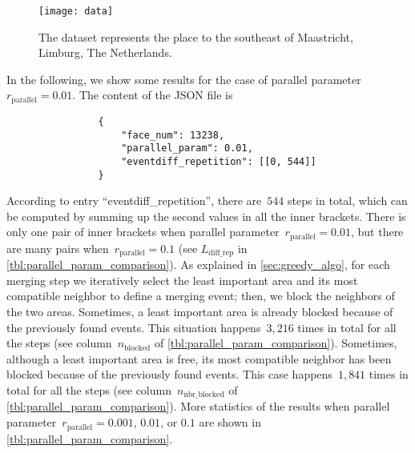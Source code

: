 \documentclass[ijgi,article,submit,moreauthors,pdftex]{Definitions/mdpi}
\begin{document}
\begin{figure}[tb]
\centering
\texttt{[image: data]}
\caption{The dataset represents the place 
    to the southeast of Maastricht, Limburg, The Netherlands.}
\label{fig:data}
\end{figure}





In the following, we show some results for the case of 
parallel parameter~$r_\mathrm{parallel}= 0.01$.
The content of the JSON file is 
\begin{verbatim}
                {
                    "face_num": 13238,
                    "parallel_param": 0.01,                    
                    "eventdiff_repetition": [[0, 544]]
                }
\end{verbatim}
According to entry ``eventdiff\_repetition'',
there are~$544$ steps in total, 
which can be computed by summing up the second values in all the inner brackets.
There is only one pair of inner brackets 
when parallel parameter~$r_\mathrm{parallel}= 0.01$,
but there are many pairs when~$r_\mathrm{parallel}= 0.1$ 
(see $L_\mathrm{diff\_rep}$ in \tbl\ref{tbl:parallel_param_comparison}).
%
As explained in \sect\ref{sec:greedy_algo}, 
for each merging step we iteratively select the least important area 
and its most compatible neighbor to define a merging event; 
then, we block the neighbors of the two areas.
Sometimes, a least important area is already blocked 
because of the previously found events.
This situation happens~$3{,}216$ times in total for all the steps
(see column~$n_\mathrm{blocked}$ of \tbl\ref{tbl:parallel_param_comparison}).
%
Sometimes, although a least important area is free, 
its most compatible neighbor has been blocked 
because of the previously found events.
This case happens~$1{,}841$ times in total for all the steps
(see column~$n_\mathrm{nbr\_blocked}$ of \tbl\ref{tbl:parallel_param_comparison}).
%
More statistics of the results when 
parallel parameter~$r_\mathrm{parallel}=0.001$, $0.01$, or $0.1$ 
are shown in \tbl\ref{tbl:parallel_param_comparison}.
\end{document}
